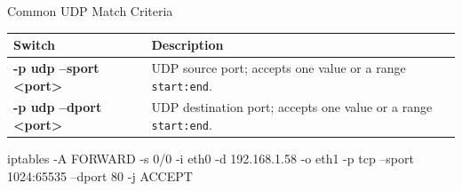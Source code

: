 \begin{frame}{Common UDP Match Criteria}
\centering\fontsize{12}{14}\selectfont
\renewcommand{\arraystretch}{1.4}
\begin{tabular}{|Y{4.8cm}|Y{7.7cm}|}\hline
{}\color{white}\bfseries Switch&\color{white}\bfseries Description\\\hline
\textcolor{CommandGreen}{\ttfamily\bfseries -p udp --sport <port>}&UDP source port; accepts one value or a range \texttt{start:end}.\\\hline
\textcolor{CommandGreen}{\ttfamily\bfseries -p udp --dport <port>}&UDP destination port; accepts one value or a range \texttt{start:end}.\\\hline
\end{tabular}
\vspace{0.35cm}
{\color{CommandGreen}\ttfamily\fontsize{11}{13}\selectfont iptables -A FORWARD -s 0/0 -i eth0 -d 192.168.1.58 -o eth1 -p tcp --sport 1024:65535 --dport 80 -j ACCEPT\par}
\end{frame}
